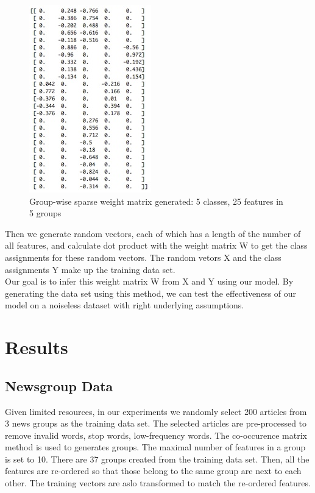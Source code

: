 \documentclass[11pt]{article}
\begin{document}
\begin{figure}[ht]
\begin{center}
	\includegraphics[width=.5\linewidth]{m_img}
	\caption{Group-wise sparse weight matrix generated: 5 classes, 25 features in 5 groups}
\end{center}
\end{figure}

Then we generate random vectors, each of which has a length of the number of all features, and calculate dot product with the weight matrix W to get the class assignments for these random vectors. The random vetors X and the class assignments Y make up the training data set. \\

Our goal is to infer this weight matrix W from X and Y using our model. By generating the data set using this method, we can test the effectiveness of our model on a noiseless dataset with right underlying assumptions.\\ 


\section{Results}

\subsection{Newsgroup Data}

Given limited resources, in our experiments we randomly select 200 articles from 3 news groups as the training data set. The selected articles are pre-processed to remove invalid words, stop words, low-frequency words. The co-occurence matrix method is used to generates groups. The maximal number of features in a group is set to 10. There are 37 groups created from the training data set. Then, all the features are re-ordered so that those belong to the same group are next to each other. The training vectors are aslo transformed to match the re-ordered features.\\  
\end{document}
